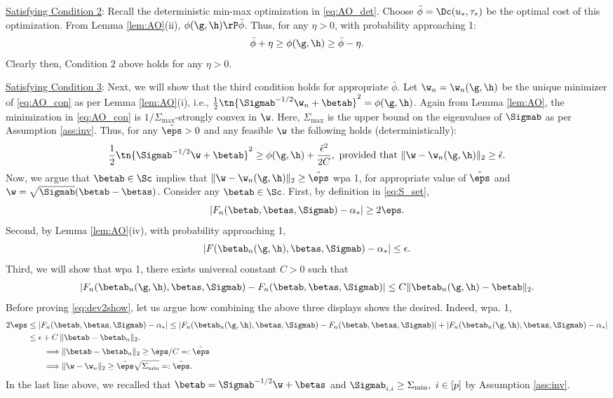 \vspace{5pt}
\noindent\underline{Satisfying Condition 2}: Recall the deterministic min-max optimization in \eqref{eq:AO_det}. Choose $\bar\phi=\Dc(u_*,\tau_*)$ be the optimal cost of this optimization. From Lemma \ref{lem:AO}(ii), $\phi(\g,\h)\rP\bar\phi$. Thus, for any $\eta>0$, with probability approaching 1:
\begin{align}\label{eq:phi_lim}
\bar\phi + \eta \geq \phi(\g,\h) \geq \bar\phi - \eta.
\end{align}
Clearly then, Condition 2 above holds for any $\eta>0$. 

\vspace{5pt}
\noindent\underline{Satisfying Condition 3}: Next, we will show that the third condition holds for appropriate $\bar\phi$. 
Let $\w_n=\w_n(\g,\h)$ be the unique minimizer of \eqref{eq:AO_con} as per Lemma \ref{lem:AO}(i), i.e., $\frac{1}{2}\tn{\Sigmab^{-1/2}\w_n+\betab}^2 = \phi(\g,\h)$. Again from Lemma \ref{lem:AO}, the minimization in \eqref{eq:AO_con} is $1/\Sigma_{\max}$-strongly convex in $\w$. Here, $\Sigma_{\max}$ is the upper bound on the eigenvalues of $\Sigmab$ as per Assumption \ref{ass:inv}. Thus, for any $\tilde\eps>0$ and any feasible $\w$ the following holds (deterministically):
\begin{align}\label{eq:sc}
\frac{1}{2}\tn{\Sigmab^{-1/2}\w+\betab}^2 \geq \phi(\g,\h) + \frac{\tilde\epsilon^2}{2C},~\text{provided that}~ \|\w-\w_n(\g,\h)\|_2 \geq \tilde\epsilon.
\end{align}
Now, we argue that $\betab\in\Sc$ implies that $\|\w-\w_n(\g,\h)\|_2\geq \tilde\eps$ wpa 1, for 
appropriate value of $\tilde\eps$ and $\w=\sqrt{\Sigmab}(\betab-\betas)$. Consider any $\betab\in\Sc$. First, by definition in \eqref{eq:S_set},
$$
|F_n(\betab,\betas,\Sigmab)-\alpha_*| \geq 2\eps.
$$
Second, by Lemma \ref{lem:AO}(iv), with probability approaching 1,
$$
|F(\betab_n(\g,\h),\betas,\Sigmab) - \alpha_*| \leq \epsilon.
$$
Third, we will show that wpa 1, there exists universal constant $C>0$ such that
\begin{align}
|F_n(\betab_n(\g,\h),\betas,\Sigmab) - F_n(\betab,\betas,\Sigmab)| \leq C {\|\betab_{n}(\g,\h) - \betab\|_2}\label{eq:dev2show}.
\end{align}
Before proving \eqref{eq:dev2show}, let us argue how combining the above three displays shows the desired. Indeed, wpa. 1,
\begin{align*}
2\eps &\leq |F_n(\betab,\betas,\Sigmab)-\alpha_*| \leq |F_n(\betab_n(\g,\h),\betas,\Sigmab) - F_n(\betab,\betas,\Sigmab)| + |F_n(\betab_n(\g,\h),\betas,\Sigmab) - \alpha_*| \\
&\leq \epsilon + C \,\|\betab-\betab_n\|_2. \\
&\qquad\Longrightarrow \|\betab-\betab_n\|_2 \geq {\eps}/{C}=:\hat\eps\\
&\qquad\Longrightarrow \|\w-\w_n\|_2 \geq \hat\eps\sqrt{\Sigma_{\min}}=:\tilde\eps.
\end{align*}
In the last line above, we recalled that $\betab=\Sigmab^{-1/2}\w+\betas$ and $\Sigmab_{i,i}\geq\Sigma_{\min},~i\in[p]$ by Assumption \ref{ass:inv}.

